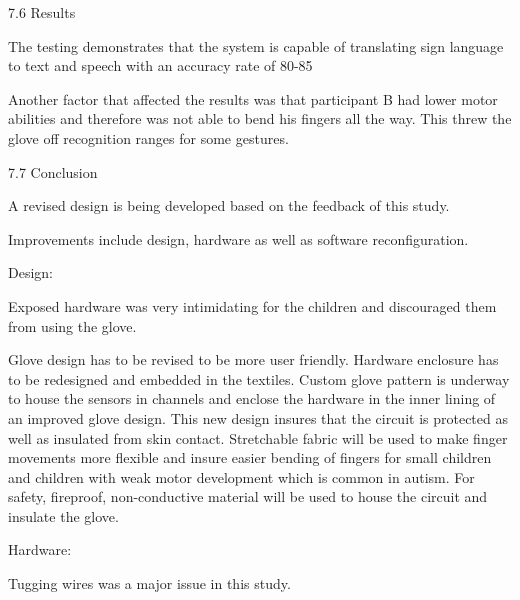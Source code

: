 7.6 Results 

The testing demonstrates that the system is capable of translating sign language to text and speech with an accuracy rate of 80-85%

Another factor that affected the results was that participant B had lower motor abilities and therefore was not able to bend his fingers all the way.  This threw the glove off recognition ranges for some gestures.   



7.7 Conclusion

A revised design is being developed based on the feedback of this study. 

Improvements include design, hardware as well as software reconfiguration. 

Design: 

Exposed hardware was very intimidating for the children and discouraged them from using the glove.

Glove design has to be revised to be more user friendly. Hardware enclosure has to be redesigned and embedded in the textiles. Custom glove pattern is underway to house the sensors in channels and enclose the hardware in the inner lining of an improved glove design. This new design insures that the circuit is protected as well as insulated from skin contact. Stretchable fabric will be used to make finger movements more flexible and insure easier bending of fingers for small children and children with weak motor development which is common in autism. For safety, fireproof, non-conductive material will be used to house the circuit and insulate the glove.   

Hardware: 

Tugging wires was a major issue in this study. 

